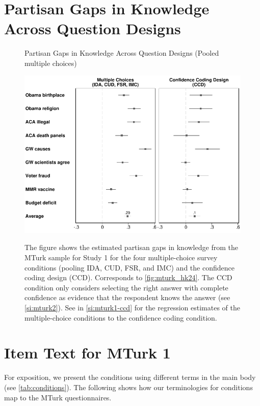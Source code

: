\section{Partisan Gaps in Knowledge Across Question Designs}
\begin{center}
	\begin{figure}[ht]
		\centering
		\caption{Partisan Gaps in Knowledge Across Question Designs (Pooled multiple choices)}
		\includegraphics[width=.9\textwidth]{../figs/partisan-gap-by-item-arm-mc-24k.pdf}
		\label{fig:mturk_hk24_mc}
		\caption*{\footnotesize
		The figure shows the estimated partisan gaps in knowledge from the MTurk sample for Study 1 for the four multiple-choice survey conditions (pooling IDA, CUD, FSR, and IMC) and the confidence coding design (CCD). Corresponds to \cref{fig:mturk_hk24}.
            The CCD condition only considers selecting the right answer with complete confidence as evidence that the respondent knows the answer (see \cref{si:mturk2}).
            See  in \cref{si:mturk1-ccd} for the regression estimates of the multiple-choice conditions to the confidence coding condition.
		}
	\end{figure}
\end{center}

\clearpage
\section{Item Text for MTurk 1}\label{si:mturk1}
For exposition, we present the conditions using different terms in the main body (see \cref{tab:conditions}). The following shows how our terminologies for conditions map to the MTurk questionnaires.

